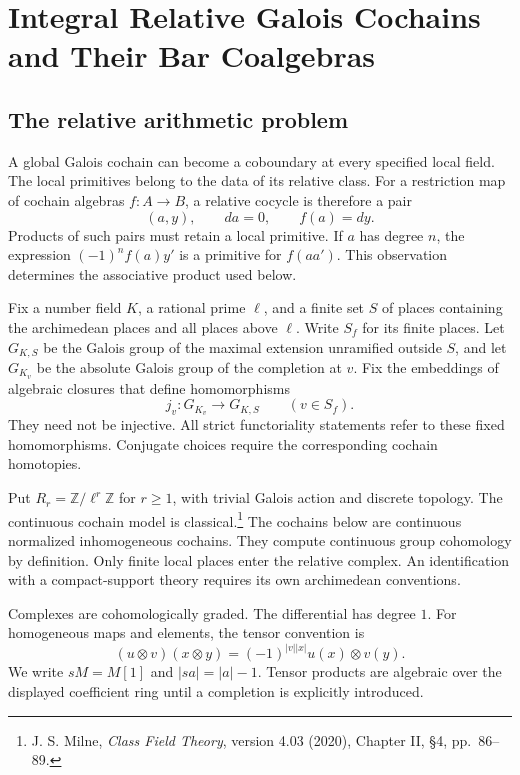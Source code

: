 \chapter{Integral Relative Galois Cochains and Their Bar Coalgebras}
\label{v4-arith:relative-bar:chapter}

\section{The relative arithmetic problem}

A global Galois cochain can become a coboundary at every specified local
field. The local primitives belong to the data of its relative class.
For a restriction map of cochain algebras $f:A\to B$, a relative cocycle
is therefore a pair
\[
 (a,y),\qquad da=0,\qquad f(a)=dy.
\]
Products of such pairs must retain a local primitive. If $a$ has degree
$n$, the expression $(-1)^nf(a)y'$ is a primitive for $f(aa')$.
This observation determines the associative product used below.

Fix a number field $K$, a rational prime $\ell$, and a finite set $S$
of places containing the archimedean places and all places above $\ell$.
Write $S_f$ for its finite places. Let $G_{K,S}$ be the Galois group of
the maximal extension unramified outside $S$, and let $G_{K_v}$ be the
absolute Galois group of the completion at $v$. Fix the embeddings of
algebraic closures that define homomorphisms
\[
 j_v:G_{K_v}\longrightarrow G_{K,S}\qquad(v\in S_f).
\]
They need not be injective. All strict functoriality statements refer to
these fixed homomorphisms. Conjugate choices require the corresponding
cochain homotopies.

Put $R_r=\mathbb{Z}/\ell^r\mathbb{Z}$ for $r\geq1$, with trivial Galois action and
discrete topology. The continuous cochain model is classical.\footnote{J. S. Milne, \emph{Class Field Theory}, version 4.03 (2020), Chapter II, \S4, pp.~86--89.}
The cochains below are continuous normalized
inhomogeneous cochains. They compute continuous group cohomology by
definition. Only finite local places enter the relative complex.
An identification with a compact-support theory requires its own
archimedean conventions.

Complexes are cohomologically graded. The differential has degree $1$.
For homogeneous maps and elements, the tensor convention is
\[
 (u\otimes v)(x\otimes y)=(-1)^{|v||x|}u(x)\otimes v(y).
\]
We write $sM=M[1]$ and $|sa|=|a|-1$. Tensor products are algebraic
over the displayed coefficient ring until a completion is explicitly
introduced.

